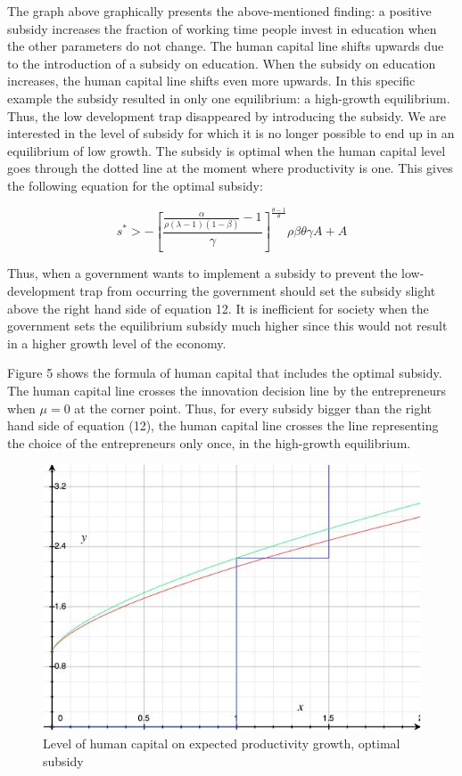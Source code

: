 \documentclass[a4paper,11pt]{article} %
\begin{document}
The graph above graphically presents the above-mentioned finding: a positive subsidy increases the fraction of working time people invest in education when the other parameters do not change. The human capital line shifts upwards due to the introduction of a subsidy on education. When the subsidy on education increases, the human capital line shifts even more upwards. In this specific example the subsidy resulted in only one equilibrium: a high-growth equilibrium. Thus, the low development trap disappeared by introducing the subsidy. We are interested in the level of subsidy for which it is no longer possible to end up in an equilibrium of low growth. The subsidy is optimal when the human capital level goes through the dotted line at the moment where productivity is one. This gives the following equation for the optimal subsidy:

\begin{equation}
  s^* > - \left[ \frac{
   \frac{\alpha}{\rho \left( \lambda-1 \right) \left(1-\beta\right)}-1
    }{\gamma} \right]
  ^{ \frac{\theta-1}{\theta}}
  \rho\beta\theta\gamma A + A
\end{equation}

Thus, when a government wants to implement a subsidy to prevent the low-development trap from occurring the government should set the subsidy slight above the right hand side of equation 12. It is inefficient for society when the government sets the equilibrium subsidy much higher since this would not result in a higher growth level of the economy. 

Figure 5 shows the formula of human capital that includes the optimal subsidy. The human capital line crosses the innovation decision line by the entrepreneurs when \(\mu=0\) at the corner point. Thus, for every subsidy bigger than the right hand side of equation (12), the human capital line crosses the line representing the choice of the entrepreneurs only once, in the high-growth equilibrium.

\begin{figure}
  \centering
  \includegraphics{figure5.png}
  \caption{Level of human capital on expected productivity growth, optimal subsidy}
\end{figure}
\end{document}

